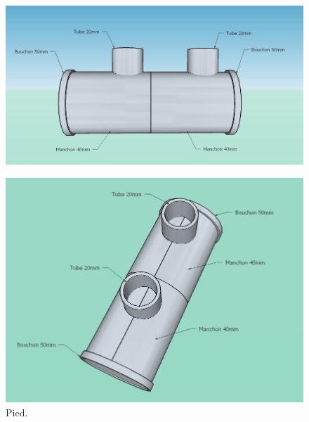 \documentclass[11pt,a4paper]{article}
\begin{document}
          \begin{figure}[H]
            \centering
            \includegraphics[scale=0.4]{ROVPiedCote.jpg}
          \end{figure}  
          \begin{figure}[H]
            \centering
            \includegraphics[scale=0.4]{ROVPiedHaut.jpg}
            \caption{Pied.}
          \end{figure}
        
\end{document}
